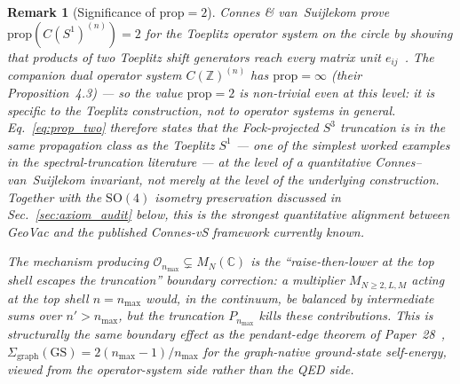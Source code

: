 \documentclass[11pt]{article}
\newtheorem{remark}{Remark}
\begin{document}
\begin{remark}[Significance of $\mathrm{prop} = 2$]
Connes \& van~Suijlekom prove $\mathrm{prop}(C(S^1)^{(n)}) = 2$ for
the Toeplitz operator system on the circle by showing that products
of two Toeplitz shift generators reach every matrix unit
$e_{ij}$~\cite{connes_vs2021}.  The companion dual operator system
$C(\mathbb{Z})^{(n)}$ has $\mathrm{prop} = \infty$ (their
Proposition~4.3) — so the value $\mathrm{prop} = 2$ is non-trivial
even at this level: it is specific to the Toeplitz construction, not
to operator systems in general.  Eq.~\eqref{eq:prop_two} therefore
states that the Fock-projected $S^3$ truncation is in the same
propagation class as the Toeplitz $S^1$ — one of the simplest worked
examples in the spectral-truncation literature — at the level of a
quantitative Connes--van~Suijlekom invariant, not merely at the
level of the underlying construction.  Together with the
$\mathrm{SO}(4)$ isometry preservation discussed in
Sec.~\ref{sec:axiom_audit} below, this is the strongest
quantitative alignment between GeoVac and the published Connes-vS
framework currently known.

The mechanism producing
$\mathcal{O}_{n_{\max}} \subsetneq M_N(\mathbb{C})$ is the
``raise-then-lower at the top shell escapes the truncation'' boundary
correction: a multiplier $M_{N \ge 2, L, M}$ acting at the top shell
$n = n_{\max}$ would, in the continuum, be balanced by intermediate
sums over $n' > n_{\max}$, but the truncation $P_{n_{\max}}$ kills
these contributions.  This is structurally the same boundary effect
as the pendant-edge theorem of Paper~28~\cite{paper28},
$\Sigma_{\mathrm{graph}}(\mathrm{GS}) = 2(n_{\max} - 1)/n_{\max}$ for
the graph-native ground-state self-energy, viewed from the
operator-system side rather than the QED side.
\end{remark}
\end{document}
